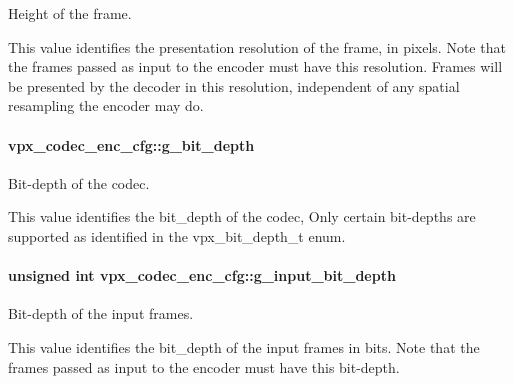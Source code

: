 Height of the frame. 

This value identifies the presentation resolution of the frame, in pixels. Note that the frames passed as input to the encoder must have this resolution. Frames will be presented by the decoder in this resolution, independent of any spatial resampling the encoder may do. 
\paragraph[{\texorpdfstring{g\+\_\+bit\+\_\+depth}{g_bit_depth}}]{ vpx\+\_\+codec\+\_\+enc\+\_\+cfg\+::g\+\_\+bit\+\_\+depth}\hypertarget{structvpx__codec__enc__cfg_aaaa7bca27fd42f24a2c215b247ba9190}{}\label{structvpx__codec__enc__cfg_aaaa7bca27fd42f24a2c215b247ba9190}


Bit-\/depth of the codec. 

This value identifies the bit\+\_\+depth of the codec, Only certain bit-\/depths are supported as identified in the vpx\+\_\+bit\+\_\+depth\+\_\+t enum. 
\paragraph[{\texorpdfstring{g\+\_\+input\+\_\+bit\+\_\+depth}{g_input_bit_depth}}]{\setlength{\rightskip}{0pt plus 5cm}unsigned int vpx\+\_\+codec\+\_\+enc\+\_\+cfg\+::g\+\_\+input\+\_\+bit\+\_\+depth}\hypertarget{structvpx__codec__enc__cfg_abebad3c575d7a5ba6c09a52fedb7d762}{}\label{structvpx__codec__enc__cfg_abebad3c575d7a5ba6c09a52fedb7d762}


Bit-\/depth of the input frames. 

This value identifies the bit\+\_\+depth of the input frames in bits. Note that the frames passed as input to the encoder must have this bit-\/depth. 
